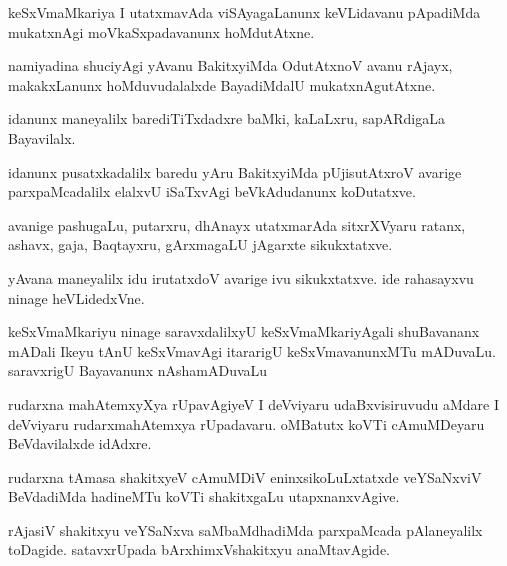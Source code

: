 \begin{mng}
keSxVmaMkariya I utatxmavAda viSAyagaLanunx keVLidavanu pApadiMda mukatxnAgi moVkaSxpadavanunx hoMdutAtxne.
\end{mng}

\begin{mng}
namiyadina shuciyAgi yAvanu BakitxyiMda OdutAtxnoV avanu rAjayx, makakxLanunx hoMduvudalalxde BayadiMdalU mukatxnAgutAtxne.
\end{mng}

\begin{mng}
idanunx maneyalilx barediTiTxdadxre baMki, kaLaLxru, sapARdigaLa Bayavilalx.
\end{mng}

\begin{mng}
idanunx pusatxkadalilx baredu yAru BakitxyiMda pUjisutAtxroV avarige parxpaMcadalilx elalxvU iSaTxvAgi beVkAdudanunx koDutatxve.
\end{mng}

\begin{mng}
avanige pashugaLu, putarxru, dhAnayx utatxmarAda sitxrXVyaru ratanx, ashavx, gaja, Baqtayxru, gArxmagaLU jAgarxte sikukxtatxve.
\end{mng}

\begin{mng}
yAvana maneyalilx idu irutatxdoV avarige ivu sikukxtatxve. ide rahasayxvu ninage heVLidedxVne.
\end{mng}

\begin{mng}
keSxVmaMkariyu ninage saravxdalilxyU keSxVmaMkariyAgali shuBavananx mADali Ikeyu tAnU keSxVmavAgi itararigU keSxVmavanunxMTu mADuvaLu. saravxrigU Bayavanunx nAshamADuvaLu
\end{mng}

\begin{mng}
rudarxna mahAtemxyXya rUpavAgiyeV I deVviyaru udaBxvisiruvudu aMdare I deVviyaru rudarxmahAtemxya rUpadavaru. oMBatutx koVTi cAmuMDeyaru BeVdavilalxde idAdxre.
\end{mng}

\begin{mng}
rudarxna tAmasa shakitxyeV cAmuMDiV eninxsikoLuLxtatxde veYSaNxviV BeVdadiMda hadineMTu koVTi shakitxgaLu utapxnanxvAgive.
\end{mng}

\begin{mng}
rAjasiV shakitxyu veYSaNxva saMbaMdhadiMda parxpaMcada pAlaneyalilx toDagide. satavxrUpada bArxhimxVshakitxyu anaMtavAgide.
\end{mng}

